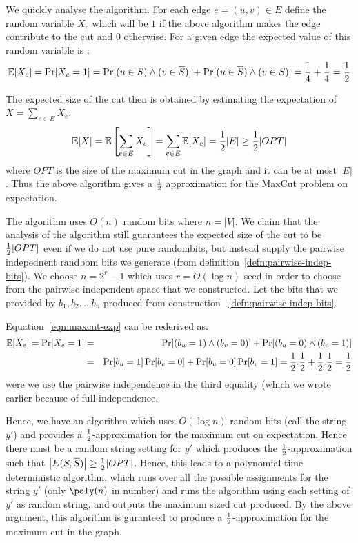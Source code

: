 We quickly analyse the algorithm. For each edge $e=(u,v) \in E$ define the random variable $X_e$ which will be $1$ if the above algorithm makes the edge contribute to the cut and $0$ otherwise.
For a given edge the expected value of this random variable is :
\begin{equation}
\label{eqn:maxcut-exp}
\E[X_e] = \Pr[X_e = 1] = \Pr[(u \in S) \land (v \in \bar{S})] + \Pr[(u \in \bar{S}) \land (v \in S)] = \frac{1}{4}+\frac{1}{4} = \half
\end{equation}

\noindent The expected size of the cut then is obtained by estimating the expectation of $X = \sum_{e \in E} X_e$:
$${\mathbb E}[X] = {\mathbb E}\left[\sum_{e \in E} X_e\right] = \sum_{e \in E} {\mathbb E}[X_e] = \frac{1}{2} |E| \ge \frac{1}{2} |OPT|$$
where $OPT$ is the size of the maximum cut in the graph and it can be at most $|E|$. Thus the above algorithm gives a $\frac{1}{2}$ approximation for the {\sc MaxCut} problem on expectation.

The algorithm uses $O(n)$ random bits where $n=|V|$. We claim that the analysis of the algorithm still guarantees the expected size of the cut to be $\frac{1}{2}|OPT|$ even if we do not use pure randombits, but instead supply the pairwise indepednent randbom bits we generate (from definition~\ref{defn:pairwise-indep-bits}). We choose $n = 2^r - 1$ which uses $r = O(\log n)$ seed in order to choose from the pairwise independent space that we constructed.
Let the bits that we provided by $b_1, b_2, \ldots b_n$ produced from construction ~\ref{defn:pairwise-indep-bits}.

\noindent Equation~\ref{eqn:maxcut-exp} can be rederived as:
\begin{eqnarray*}
{\mathbb E}[X_e] = \Pr[X_e = 1] & = & \Pr[(b_u=1) \land (b_v=0)] + \Pr[(b_u=0) \land (b_v=1)] \\
& = & \Pr[b_u=1]\Pr[b_v=0] + \Pr[b_u=0]\Pr[b_v=1] = \frac{1}{2}.\frac{1}{2}+\frac{1}{2}.\frac{1}{2} = \frac{1}{2}
\end{eqnarray*}
were we use the pairwise independence in the third equality (which we wrote earlier because of full independence.

Hence, we have an algorithm which uses $O(\log n)$ random bits (call the string $y'$) and provides a $\frac{1}{2}$-approximation for the maximum cut on expectation. Hence there must be a random string setting for $y'$ which produces the $\frac{1}{2}$-approximation such that $\card{E(S,\bar{S})} \ge \half|OPT|$. Hence, this leads to a polynomial time deterministic algorithm, which runs over all the possible assignments for the string $y'$ (only $\poly(n)$ in number) and runs the algorithm using each setting of $y'$ as random string, and outputs the maximum sized cut produced. By the above argument, this algorithm is guranteed to produce a $\frac{1}{2}$-approximation for the maximum cut in the graph.

